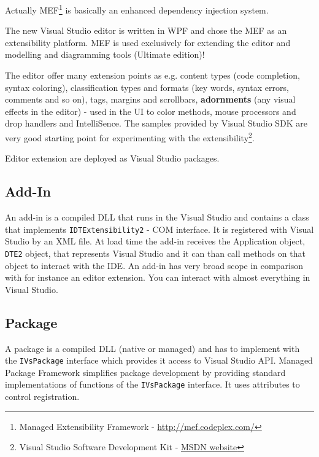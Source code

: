 Actually MEF\footnote{Managed Extensibility Framework - \href{http://mef.codeplex.com/}{http://mef.codeplex.com/} } 
is basically an enhanced dependency injection system. 

The new Visual Studio editor is written in WPF and chose the MEF as an extensibility platform. MEF is used exclusively for extending the editor and modelling and diagramming tools (Ultimate edition)!

The editor offer many extension points as e.g. content types (code completion, syntax coloring), classification types and formats (key words, syntax errors, comments and so on), tags, margins and scrollbars, \textbf{adornments} (any visual effects in the editor) - used in the UI to color methods, mouse processors and drop handlers and IntelliSence. The samples provided by Visual Studio SDK are very good starting point for experimenting with the extensibility\footnote{Visual Studio Software Development Kit - \href{http://msdn.microsoft.com/en-us/library/bb166441(v=VS.100).aspx}{MSDN website}}.

Editor extension are deployed as Visual Studio packages.

\subsection{Add-In}
An add-in is a compiled DLL that runs in the Visual Studio and contains a class that implements \texttt{IDTExtensibility2} - COM interface. It is registered with Visual Studio by an XML file. At load time the add-in receives the Application object, \texttt{DTE2} object, that represents Visual Studio and it can than call methods on that object to interact with the IDE. An add-in has very broad scope in comparison with for instance an editor extension. You can interact with almost everything in Visual Studio.

\subsection{Package}
A package is a compiled DLL (native or managed) and has to implement with the \texttt{IVsPackage} interface which provides it access to Visual Studio API. Managed Package Framework simplifies package development by providing standard implementations of functions of the \texttt{IVsPackage} interface. It uses attributes to control registration.

